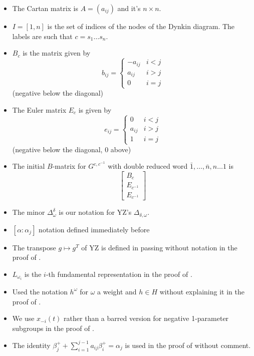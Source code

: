 \documentclass[12pt]{amsart}
\theoremstyle{remark}
\numberwithin{equation}{section}
\numberwithin{figure}{section}
\begin{document}
\begin{itemize}

  \item 
    The Cartan matrix is $A=(a_{ij})$ and it's $n \times n$.

  \item 
    $I=[1,n]$ is the set of indices of the nodes of the Dynkin diagram. The labels are such that $c=s_1\dots s_n$.

  \item 
    $B_c$ is the matrix given by
    \[
      b_{ij} = \begin{cases}
        -a_{ij} & i<j\\
        a_{ij}  & i>j\\
        0       & i=j
      \end{cases}
    \]
    (negative below the diagonal)

  \item
    The Euler matrix $E_c$ is given by
    \[
      e_{ij} = \begin{cases}
        0       & i<j\\
        a_{ij}  & i>j\\
        1       & i=j
      \end{cases}
    \]
    (negative below the diagonal, 0 above)

  \item
    The initial $B$-matrix for $G^{c,c^{-1}}$ with double reduced word $\bar 1,\dots,\bar n,n\dots 1$ is
    \[
      \left[
        \begin{array}{c}
          B_c\\
          E_{c^{-1}}\\
          E_{c^{-1}}
        \end{array}
      \right]
    \]
  
  \item 
    The minor $\Delta_\omega^\delta$ is our notation for YZ's $\Delta_{\delta, \omega}$.
  
  \item 
    $[\alpha:\alpha_j]$ notation defined immediately before 
  
  \item 
    The transpose $g \mapsto g^T$ of YZ is defined in passing without notation in the proof of .
  
  \item 
    $L_{\omega_i}$ is the $i$-th fundamental representation in the proof of .

  \item 
    Used the notation $h^\omega$ for $\omega$ a weight and $h \in H$ without explaining it in the proof of .

  \item 
    We use $x_{-i}(t)$ rather than a barred version for negative 1-parameter subgroups in the proof of .

  \item 
    The identity $\beta_j^+ + \sum_{i=1}^{j-1} a_{ij} \beta_i^+ = \alpha_j$ is used in the proof of  without comment.
\end{itemize}
\end{document}
